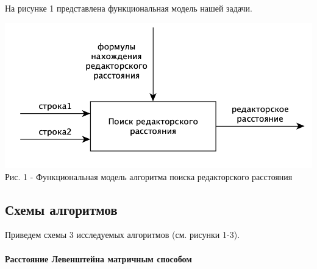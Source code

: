 \documentclass[a4paper,14pt]{article} %
\begin{document}
	На рисунке 1 представлена функциональная модель нашей задачи.  
	\begin{center}
		\includegraphics[scale = 0.8]{idef0} \\ Рис.  1 - Функциональная модель алгоритма поиска редакторского расстояния
	\end{center}
        
        \subsection{Схемы алгоритмов}
        Приведем схемы 3 исследуемых алгоритмов (см. рисунки 1-3). 
        
        \paragraph{Расстояние Левенштейна матричным способом}
        
\end{document}
